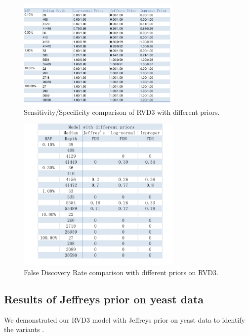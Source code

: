 \documentclass[11pt,reqno]{amsart}
\begin{document}
\begin{figure}[htbp]
\begin{center}
\includegraphics[width=80mm]{tables/Sen_Speci.pdf}
\caption{Sensitivity/Specificity comparison of RVD3 with different priors.}
\label{fig:SS}
\end{center}
\end{figure}


\begin{figure}[htbp]
\begin{center}
\includegraphics[width=80mm]{tables/FDR.pdf}
\caption{False Discovery Rate comparison with different priors on RVD3.}
\label{fig:FDR}
\end{center}
\end{figure}

\subsection{Results of Jeffreys prior on yeast data}

We demonstrated our RVD3 model with Jeffreys prior on yeast data to identify the variants \citep{kvitek2013whole}.
\end{document}
